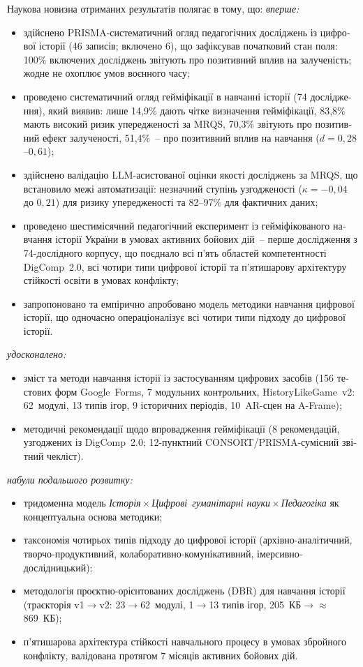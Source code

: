 {\begin{otherlanguage}{ukrainian}
{Наукова новизна отриманих результатів полягає в тому, що:
\textit{вперше:}
\begin{itemize}
\item здійснено PRISMA-систематичний огляд педагогічних досліджень із цифрової
  історії (46 записів; включено 6), що зафіксував початковий стан поля: 100\%
  включених досліджень звітують про позитивний вплив на залученість; жодне не
  охоплює умов воєнного часу;
\item проведено систематичний огляд гейміфікації в навчанні історії (74 дослідження),
  який виявив: лише 14,9\% дають чітке визначення гейміфікації, 83,8\% мають
  високий ризик упередженості за MRQS, 70,3\% звітують про позитивний ефект
  залученості, 51,4\%~-- про позитивний вплив на навчання ($d{=}0{,}28$--$0{,}61$);
\item здійснено валідацію LLM-асистованої оцінки якості досліджень за MRQS, що
  встановило межі автоматизації: незначний ступінь узгодженості ($\kappa{=}-0{,}04$
  до $0{,}21$) для ризику упередженості та 82--97\% для фактичних даних;
\item проведено шестимісячний педагогічний експеримент із гейміфікованого навчання
  історії України в умовах активних бойових дій~-- перше дослідження з
  74-дослідного корпусу, що поєднало всі п'ять областей компетентності
  DigComp~2.0, всі чотири типи цифрової історії та п'ятишарову архітектуру
  стійкості освіти в умовах конфлікту;
\item запропоновано та емпірично апробовано модель методики навчання цифрової
  історії, що одночасно операціоналізує всі чотири типи підходу до цифрової
  історії.
\end{itemize}
\textit{удосконалено:}
\begin{itemize}
\item зміст та методи навчання історії із застосуванням цифрових засобів
  (156 тестових форм Google~Forms, 7 модульних контрольних,
  HistoryLikeGame~v2: 62~модулі, 13 типів ігор, 9 історичних
  періодів, 10~AR-сцен на A-Frame);
\item методичні рекомендації щодо впровадження гейміфікації (8 рекомендацій,
  узгоджених із DigComp~2.0; 12-пунктний CONSORT/PRISMA-сумісний звітний
  чекліст).
\end{itemize}
\textit{набули подальшого розвитку:}
\begin{itemize}
\item тридоменна модель \textit{Історія\,$\times$\,Цифрові~гуманітарні
  науки\,$\times$\,Педагогіка} як концептуальна основа методики;
\item таксономія чотирьох типів підходу до цифрової історії
  (архівно-аналітичний, творчо-продуктивний,
  колаборативно-комунікативний, імерсивно-дослідницький);
\item методологія проєктно-орієнтованих досліджень (DBR) для навчання
  історії (траєкторія v1$\to$v2: 23$\to$62~модулі, 1$\to$13 типів
  ігор, 205~КБ$\to$$\approx$869~КБ);
\item п'ятишарова архітектура стійкості навчального процесу в умовах
  збройного конфлікту, валідована протягом 7 місяців активних
  бойових дій.
\end{itemize}

}
\end{otherlanguage}}

